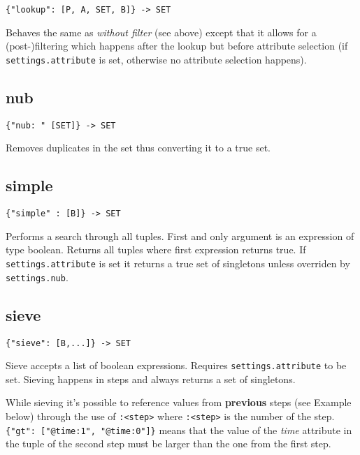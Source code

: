 \documentclass[a4paper]{article}
\begin{document}
\begin{verbatim}
{"lookup": [P, A, SET, B]} -> SET
\end{verbatim}

Behaves the same as \textit{without filter} (see above) except that it
allows for a (post-)filtering which happens after the lookup but
before attribute selection (if \verb|settings.attribute| is set,
otherwise no attribute selection happens).

\subsection{nub}

\begin{verbatim}
{"nub: " [SET]} -> SET
\end{verbatim}

Removes duplicates in the set thus converting it to a true set.


\subsection{simple}

\begin{verbatim}
{"simple" : [B]} -> SET
\end{verbatim}

Performs a search through all tuples. First and only argument is an
expression of type boolean. Returns all tuples where first expression
returns true. If \verb|settings.attribute| is set it returns a true set of
singletons unless overriden by \verb|settings.nub|.

\subsection{sieve}

\begin{verbatim}
{"sieve": [B,...]} -> SET
\end{verbatim}

Sieve accepts a list of boolean expressions. Requires
\verb|settings.attribute| to be set. Sieving happens in steps and
always returns a set of singletons.

While sieving it's possible to reference values from \textbf{previous}
steps (see Example below) through the use of \verb|:<step>| where
\verb|:<step>| is the number of the step.
\verb|{"gt": ["@time:1", "@time:0"]}| means that the value of the
\textit{time} attribute in the tuple of the second step must be larger
than the one from the first step.
\end{document}

